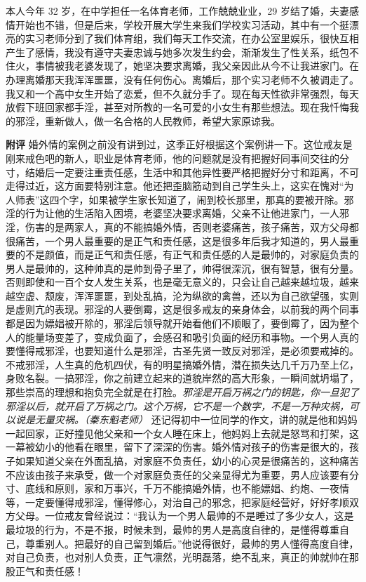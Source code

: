 \begin{case}
    本人今年 32 岁，在中学担任一名体育老师，工作兢兢业业，29 岁结了婚，夫妻感情开始也不错，但是后来，学校开展大学生来我们学校实习活动，其中有一个挺漂亮的实习老师分到了我们体育组，我们每天工作交流，在办公室里娱乐，很快互相产生了感情，我没有遵守夫妻忠诚与她多次发生约会，渐渐发生了性关系，纸包不住火，事情被我老婆发现了，她坚决要求离婚，我父亲因此从今不让我进家门。在办理离婚那天我浑浑噩噩，没有任何伤心。离婚后，那个实习老师不久被调走了。我又和一个高中女生开始了恋爱，但不久就分手了。现在每天性欲非常强烈，每天放假下班回家都手淫，甚至对所教的一名可爱的小女生有那些想法。现在我忏悔我的邪淫，重新做人，做一名合格的人民教师，希望大家原谅我。

    \textbf{附评} 婚外情的案例之前没有讲到过，这季正好根据这个案例讲一下。这位戒友是刚来戒色吧的新人，职业是体育老师，他的问题就是没有把握好同事间交往的分寸，结婚后一定要注重责任感，生活中和其他异性要严格把握好分寸和距离，不可走得过近，这方面要特别注意。他还把歪脑筋动到自己学生头上，这实在愧对“为人师表”这四个字，如果被学生家长知道了，闹到校长那里，那真的要被开除。邪淫的行为让他的生活陷入困境，老婆坚决要求离婚，父亲不让他进家门，一人邪淫，伤害的是两家人，真的不能搞婚外情，否则老婆痛苦，孩子痛苦，双方父母都很痛苦，一个男人最重要的是正气和责任感，这是很多年后我才知道的，男人最重要的不是颜值，而是正气和责任感，有正气和责任感的人是最帅的，对家庭负责的男人是最帅的，这种帅真的是帅到骨子里了，帅得很深沉，很有智慧，很有分量。否则即使和一百个女人发生关系，也是毫无意义的，只会让自己越来越垃圾，越来越空虚、颓废，浑浑噩噩，到处乱搞，沦为纵欲的禽兽，还以为自己欲望强，实则是虚则亢的表现。邪淫的人要倒霉，这是很多戒友的亲身体会，以前我的两个同事都是因为嫖娼被开除的，邪淫后领导就开始看他们不顺眼了，要倒霉了，因为整个人的能量场变差了，变成负面了，会感召和吸引负面的经历和事物。一个男人真的要懂得戒邪淫，也要知道什么是邪淫，古圣先贤一致反对邪淫，是必须要戒掉的。不戒邪淫，人生真的危机四伏，有的明星搞婚外情，潜在损失达几千万乃至上亿，身败名裂。一搞邪淫，你之前建立起来的道貌岸然的高大形象，一瞬间就坍塌了，那些崇高的理想和抱负完全就是在打脸。\textit{邪淫是开启万祸之门的钥匙，你一旦犯了邪淫以后，就开启了万祸之门。这个万祸，它不是一个数字，不是一万种灾祸，可以说是无量灾祸。（秦东魁老师）} 还记得初中一位同学的作文，讲的就是他和妈妈一起回家，正好撞见他父亲和一个女人睡在床上，他妈妈上去就是怒骂和打架，这一幕被幼小的他看在眼里，留下了深深的伤害。婚外情对孩子的伤害是很大的，孩子如果知道父亲在外面乱搞，对家庭不负责任，幼小的心灵是很痛苦的，这种痛苦不应该由孩子来承受，做一个对家庭负责任的父亲显得尤为重要，男人应该要有分寸、底线和原则，家和万事兴，千万不能搞婚外情，也不能嫖娼、约炮、一夜情等，一定要懂得戒邪淫，懂得修心，对治自己的邪念，把家庭经营好，好好孝顺双方父母。一位戒友曾经说过：“我认为一个男人最帅的不是睡过了多少女人，这是最垃圾的行为，不是不报，时候未到，最帅的男人是高度自律的，是懂得尊重自己，尊重别人。把最好的自己留到婚后。”他说得很好，最帅的男人懂得高度自律，对自己负责，也对别人负责，正气凛然，光明磊落，绝不乱来，真正的帅就帅在那股正气和责任感！
\end{case}

